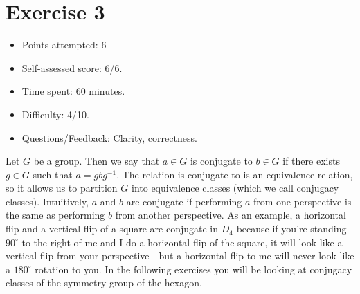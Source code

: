 \documentclass{article}
\begin{document}
\section*{Exercise 3}
\begin{itemize}
  \item Points attempted: 6
  \item Self-assessed score: 6/6.
  \item Time spent: 60 minutes.
  \item Difficulty: 4/10.
  \item Questions/Feedback: Clarity, correctness.
\end{itemize}
Let \(G\) be a group. Then we say that \(a \in G\) is conjugate to \(b \in G\) if there exists \(g \in G\) such that \(a = g b g^{-1}\). The relation is conjugate to is an equivalence relation, so it allows us to partition \(G\) into equivalence classes (which we call conjugacy classes).
Intuitively, \(a\) and \(b\) are conjugate if performing \(a\) from one perspective is the same as performing \(b\) from another perspective.
As an example, a horizontal flip and a vertical flip of a square are conjugate in \(D_4\) because if you're standing \(90^\circ\) to the right of me and I do a horizontal flip of the square, it will look like a vertical flip from your perspective—but a horizontal flip to me will never look like a \(180^\circ\) rotation to you.
In the following exercises you will be looking at conjugacy classes of the symmetry group of the hexagon.
  
\end{document}
